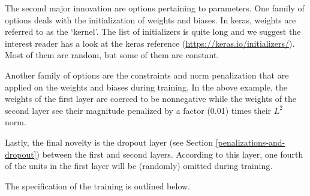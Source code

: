 \documentclass[]{krantz}
\makeatletter
\newenvironment{Shaded}{\begin{snugshade}}{\end{snugshade}}
\newcommand{\CommentTok}[1]{\textcolor[rgb]{0.37,0.37,0.37}{\textit{#1}}}
\newcommand{\DataTypeTok}[1]{\textcolor[rgb]{0.27,0.27,0.27}{#1}}
\newcommand{\FloatTok}[1]{\textcolor[rgb]{0.06,0.06,0.06}{#1}}
\newcommand{\KeywordTok}[1]{\textcolor[rgb]{0.27,0.27,0.27}{\textbf{#1}}}
\newcommand{\NormalTok}[1]{#1}
\newcommand{\OperatorTok}[1]{\textcolor[rgb]{0.43,0.43,0.43}{\textbf{#1}}}
\newcommand{\StringTok}[1]{\textcolor[rgb]{0.5,0.5,0.5}{#1}}
\newenvironment{kframe}{%
\medskip{}
\setlength{\fboxsep}{.8em}
 \def\at@end@of@kframe{}%
 \ifinner\ifhmode%
  \def\at@end@of@kframe{\end{minipage}}%
  \begin{minipage}{\columnwidth}%
 \fi\fi%
 \def\FrameCommand##1{\hskip\@totalleftmargin \hskip-\fboxsep
 \colorbox{shadecolor}{##1}\hskip-\fboxsep
     \hskip-\linewidth \hskip-\@totalleftmargin \hskip\columnwidth}%
 \MakeFramed {\advance\hsize-\width
   \@totalleftmargin\z@ \linewidth\hsize
   \@setminipage}}%
 {\par\unskip\endMakeFramed%
 \at@end@of@kframe}
\renewenvironment{Shaded}{\begin{kframe}}{\end{kframe}}
\theoremstyle{definition}
\theoremstyle{definition}
\theoremstyle{definition}
\theoremstyle{remark}
\makeatother
\begin{document}
The second major innovation are options pertaining to parameters. One
family of options deals with the initialization of weights and biases.
In keras, weights are referred to as the `kernel'. The list of
initializers is quite long and we suggest the interest reader has a look
at the keras reference (\url{https://keras.io/initializers/}). Most of
them are random, but some of them are constant.

Another family of options are the constraints and norm penalization that
are applied on the weights and biases during training. In the above
example, the weights of the first layer are coerced to be nonnegative
while the weights of the second layer see their magnitude penalized by a
factor (0.01) times their \(L^2\) norm.

Lastly, the final novelty is the dropout layer (see Section
\ref{penalizations-and-dropout}) between the first and second layers.
According to this layer, one fourth of the units in the first layer will
be (randomly) omitted during training.

The specification of the training is outlined below.

\footnotesize

\begin{Shaded}
\end{Shaded}
\end{document}

